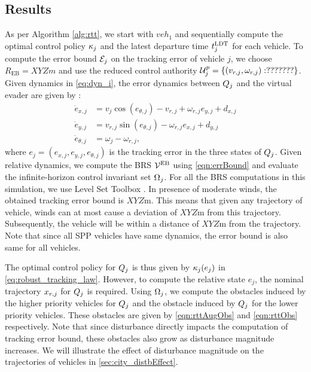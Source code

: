 \subsection{Results \label{sec:city_simResults}}
As per Algorithm \ref{alg:rtt}, we start with $veh_1$ and sequentially compute the optimal control policy $\kappa_j$ and the latest departure time $t^\text{LDT}_j$ for each vehicle. To compute the error bound $\mathcal{E}_j$ on the tracking error of vehicle $j$, we choose $R_{\text{EB}} = XYZm$ and use the reduced control authority $\mathcal{U}^p_j = \{(v_{r,j}, \omega_{r,j}): ???????\}$. Given dynamics in \eqref{eq:dyn_i}, the error dynamics between $Q_j$ and the virtual evader are given by \cite{Mitchell05}:
\begin{equation}
\label{eq:reldyn}
\begin{aligned}
\dot{e}_{x,j} &= v_{j} \cos(e_{\theta,j}) - v_{r,j} + \omega_{r,j}{e}_{y,j} + d_{x,j}\\
\dot{e}_{y,j} &= v_{r,j}\sin(e_{\theta,j}) - \omega_{r,j}{e}_{x,j} + d_{y,j}\\
\dot{e}_{\theta,j} &= \omega_{j} - \omega_{r,j},
\end{aligned}
\end{equation}    
where $e_j = ({e}_{x,j}, {e}_{y,j}, {e}_{\theta,j})$ is the tracking error in the three states of $Q_j$. Given relative dynamics, we compute the BRS $\mathcal{V}^{\text{EB}}$ using \eqref{eqn:errBound} and evaluate the infinite-horizon control invariant set $\Omega_j$. For all the BRS computations in this simulation, we use Level Set Toolbox \cite{Mitchell07b}. In presence of moderate winds, the obtained tracking error bound is $XYZ$m. This means that given any trajectory of vehicle, winds can at most cause a deviation of $XYZ$m from this trajectory. Subsequently, the vehicle will be within a distance of $XYZ$m from the trajectory. Note that since all SPP vehicles have same dynamics, the error bound is also same for all vehicles. 

The optimal control policy for $Q_j$ is thus given by $\kappa_j(e_j)$ in \eqref{eq:robust_tracking_law}. However, to compute the relative state $e_j$, the nominal trajectory $x_{r,j}$ for $Q_j$ is required. Using $\Omega_j$, we compute the obstacles induced by the higher priority vehicles for $Q_j$ and the obstacle induced by $Q_j$ for the lower priority vehicles. These obstacles are given by \eqref{eqn:rttAugObs} and \eqref{eqn:rttObs} respectively. Note that since disturbance directly impacts the computation of tracking error bound, these obstacles also grow as disturbance magnitude increases. We will illustrate the effect of disturbance magnitude on the trajectories of vehicles in \ref{sec:city_distbEffect}.

